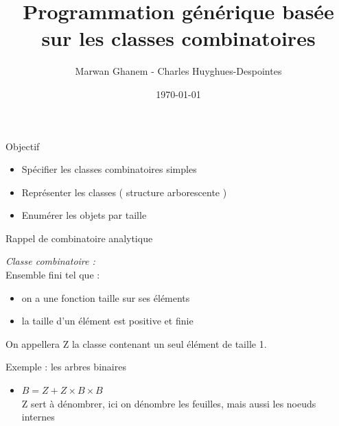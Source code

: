 \documentclass{beamer}
\title{Programmation générique basée sur les classes combinatoires}
\author{Marwan Ghanem - Charles Huyghues-Despointes}
\date{\today}
\begin{document}
\maketitle




\begin{frame}{Objectif}

\begin{itemize}
\item Spécifier les classes combinatoires simples
\item Représenter les classes ( structure arborescente )
\item Enumérer les objets par taille
\end{itemize}

\end{frame}





\begin{frame}{Rappel de combinatoire analytique}
\begin{definition}
\emph{Classe combinatoire :} \\
Ensemble fini tel que : \\
\begin{itemize}
\item on a une fonction taille sur ses éléments
\item la taille d'un élément est positive et finie
\end{itemize}

On appellera Z la classe contenant un seul élément de taille 1.
\end{definition}
\begin{block}{Exemple : les arbres binaires}
\begin{itemize}
\item $B = Z + Z \times B \times B$ \\
Z sert à dénombrer,
ici on dénombre les feuilles, mais aussi les noeuds internes
\end{itemize}
\end{block}
\end{frame}
\end{document}
